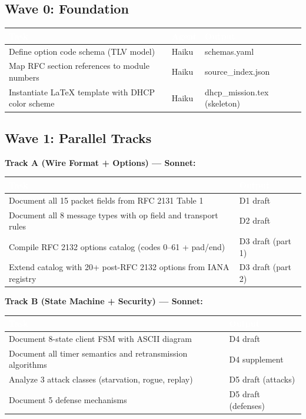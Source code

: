 \documentclass[11pt,letterpaper]{article}
\newcommand{\tableheader}[1]{\textbf{\sffamily\textcolor{white}{#1}}}
\begin{document}
\subsection{Wave 0: Foundation}

\begin{center}
\begin{tabularx}{\textwidth}{L{4cm}C{2cm}X}
\toprule
{}
\tableheader{Task} & \tableheader{Agent} & \tableheader{Output} \\
\midrule
Define option code schema (TLV model) & Haiku & schemas.yaml \\
Map RFC section references to module numbers & Haiku & source\_index.json \\
Instantiate LaTeX template with DHCP color scheme & Haiku & dhcp\_mission.tex (skeleton) \\
\bottomrule
\end{tabularx}
\end{center}

\subsection{Wave 1: Parallel Tracks}

\textbf{Track A (Wire Format + Options) --- Sonnet:}

\begin{center}
\begin{tabularx}{\textwidth}{L{4.5cm}X}
\toprule
{}
\tableheader{Task} & \tableheader{Output} \\
\midrule
Document all 15 packet fields from RFC 2131 Table 1 & D1 draft \\
Document all 8 message types with op field and transport rules & D2 draft \\
Compile RFC 2132 options catalog (codes 0--61 + pad/end) & D3 draft (part 1) \\
Extend catalog with 20+ post-RFC 2132 options from IANA registry & D3 draft (part 2) \\
\bottomrule
\end{tabularx}
\end{center}

\textbf{Track B (State Machine + Security) --- Sonnet:}

\begin{center}
\begin{tabularx}{\textwidth}{L{4.5cm}X}
\toprule
{}
\tableheader{Task} & \tableheader{Output} \\
\midrule
Document 8-state client FSM with ASCII diagram & D4 draft \\
Document all timer semantics and retransmission algorithms & D4 supplement \\
Analyze 3 attack classes (starvation, rogue, replay) & D5 draft (attacks) \\
Document 5 defense mechanisms & D5 draft (defenses) \\
\bottomrule
\end{tabularx}
\end{center}
\end{document}
